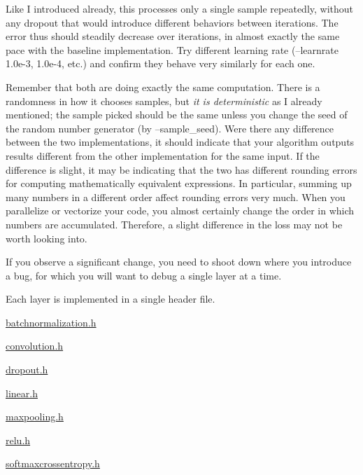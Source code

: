 

Like I introduced already, this processes only a single sample repeatedly, without any dropout that would introduce different behaviors between iterations. The error thus should steadily decrease over iterations, in almost exactly the same pace with the baseline implementation. Try different learning rate (--learnrate 1.\+0e-\/3, 1.\+0e-\/4, etc.) and confirm they behave very similarly for each one.

Remember that both are doing exactly the same computation. There is a randomness in how it chooses samples, but {\itshape it is deterministic} as I already mentioned; the sample picked should be the same unless you change the seed of the random number generator (by --sample\+\_\+seed). Were there any difference between the two implementations, it should indicate that your algorithm outputs results different from the other implementation for the same input. If the difference is slight, it may be indicating that the two has different rounding errors for computing mathematically equivalent expressions. In particular, summing up many numbers in a different order affect rounding errors very much. When you parallelize or vectorize your code, you almost certainly change the order in which numbers are accumulated. Therefore, a slight difference in the loss may not be worth looking into.

If you observe a significant change, you need to shoot down where you introduce a bug, for which you will want to debug a single layer at a time.

Each layer is implemented in a single header file.


\begin{DoxyItemize}
\item \hyperlink{batchnormalization_8h}{batchnormalization.\+h}
\item \hyperlink{convolution_8h}{convolution.\+h}
\item \hyperlink{dropout_8h}{dropout.\+h}
\item \hyperlink{linear_8h}{linear.\+h}
\item \hyperlink{maxpooling_8h}{maxpooling.\+h}
\item \hyperlink{relu_8h}{relu.\+h}
\item \hyperlink{softmaxcrossentropy_8h}{softmaxcrossentropy.\+h}
\end{DoxyItemize}


